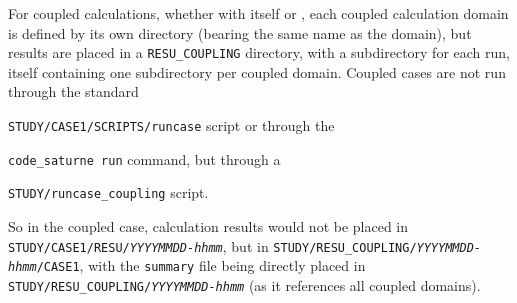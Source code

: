 For coupled calculations, whether with \CS itself or \syrthes, each coupled
calculation domain is defined by its own directory (bearing the same name
as the domain), but results are placed in a \texttt{RESU\_COUPLING}
directory, with a subdirectory for each run, itself containing one
subdirectory per coupled domain. Coupled cases are not run through
the standard {\texttt{STUDY/CASE1/SCRIPTS/runcase} script or through
the {\texttt{code\_saturne run} command, but through a
{\texttt{STUDY/runcase\_coupling} script.

So in the coupled case, calculation results would not be placed in
\texttt{STUDY/CASE1/RESU/}\emph{\texttt{YYYYMMDD-hhmm}}, but in
\texttt{STUDY/RESU\_COUPLING/}\emph{\texttt{YYYYMMDD-hhmm}}\texttt{/CASE1}, with the \texttt{summary}
file being directly placed in \texttt{STUDY/RESU\_COUPLING/}\emph{\texttt{YYYYMMDD-hhmm}}
(as it references all coupled domains).

}}}
